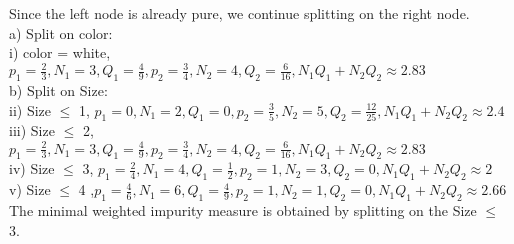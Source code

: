 \documentclass{article}
\newenvironment{sub}[2][$-$]{\begin{trivlist}
		\item[\hskip \labelsep {\bfseries #1}\hskip \labelsep {\bfseries #2.}]}  {\end{trivlist}}
\begin{document}
\begin{sub}{6.1.2}
\end{sub}
Since the left node is already pure, we continue splitting on the right node.\\

a) Split on color:\\
i) color = white,  
$p_1 = \frac{2}{3} ,N_1 = 3,Q_1 = \frac{4}{9},  p_2 = \frac{3}{4},N_2 = 4, Q_2= \frac{6}{16}, N_1Q_1 + N_2Q_2  \approx 2.83$\\

b) Split on Size:\\
ii) Size $\leq$ 1, $p_1 = 0 ,N_1 = 2,Q_1 = 0,  p_2 = \frac{3}{5},N_2 = 5, Q_2= \frac{12}{25}, N_1Q_1 + N_2Q_2  \approx 2.4$\\
iii) Size $\leq$ 2, $p_1 = \frac{2}{3} ,N_1 = 3,Q_1 = \frac{4}{9},  p_2 = \frac{3}{4},N_2 = 4, Q_2= \frac{6}{16}, N_1Q_1 + N_2Q_2  \approx 2.83$\\
iv) Size $\leq$ 3, $p_1 = \frac{2}{4} ,N_1 = 4,Q_1 = \frac{1}{2},  p_2 = 1,N_2 = 3, Q_2= 0, N_1Q_1 + N_2Q_2  \approx 2$\\
v) Size $\leq$ 4 ,$p_1 = \frac{4}{6} ,N_1 = 6,Q_1 = \frac{4}{9},  p_2 = 1,N_2 = 1, Q_2= 0, N_1Q_1 + N_2Q_2  \approx 2.66$\\
The minimal weighted impurity measure is obtained by splitting on the Size $\leq$ 3.  \\
\end{document}
